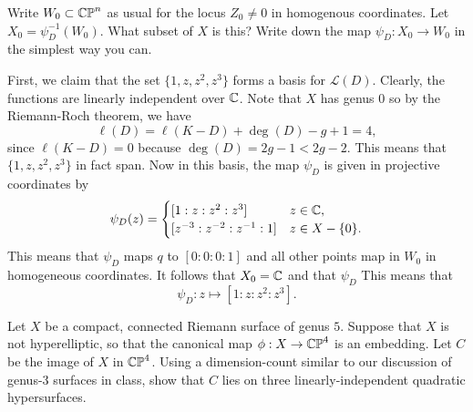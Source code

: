 \documentclass[expanded]{lkx_pset}
\begin{document}
\begin{parts}
	\begin{part}{}
		Write $W_0\subset \mathbb{CP}^n$ as usual for the locus $Z_0\neq 0$ in homogenous coordinates. Let $X_0 = \psi_D^{-1}(W_0)$. What subset of $X$ is this? Write down the map $\psi_D : X_0 \to W_0$ in the simplest way you can.
	\end{part}

	First, we claim that the set $\{1, z, z^2, z^3\}$ forms a basis for $\mathcal{L}(D)$. Clearly, the functions are linearly independent over $\mathbb{C}$. Note that $X$ has genus $0$ so by the Riemann-Roch theorem, we have
	\[
		\ell(D) = \ell(K-D) + \deg(D) - g + 1 = 4,
	\]
	since $\ell(K-D) = 0$ because $\deg(D) = 2g-1 < 2g-2$. This means that $\{1,z,z^2,z^3\}$ in fact span.
	Now in this basis, the map $\psi_D$ is given in projective coordinates by
	\[
		\psi_D(z)= \begin{cases}
			[1:z:z^2:z^3]            & z\in \mathbb{C},      \\
			[z^{-3}:z^{-2}:z^{-1}:1] & z\in X-\{0\}.
		\end{cases}
	\]
	This means that $\psi_D$ maps $q$ to $[0:0:0:1]$ and all other points map in $W_0$ in homogeneous coordinates. It follows that $X_0=\mathbb{C}$ and that $\psi_D$ This means that
	\[
		\psi_D : z \mapsto [1:z:z^2:z^3].
	\]
\end{parts}

\begin{problem}{4}
Let $X$ be a compact, connected Riemann surface of genus $5$. Suppose that $X$ is not hyperelliptic, so that the canonical map $\phi : X \to \mathbb{CP}^4$ is an embedding. Let $C$ be the image of $X$ in $\mathbb{CP}^4$. Using a dimension-count similar to our discussion of genus-$3$ surfaces in class, show that $C$ lies on three linearly-independent quadratic hypersurfaces.
\end{problem}
\end{document}
